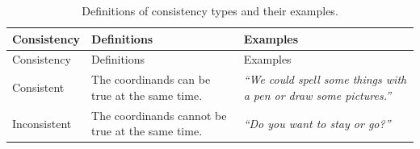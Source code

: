 \documentclass[,man,floatsintext]{apa6}
\begin{document}
\begin{longtable}[]{@{}lll@{}}
\caption{\label{tab:consistencyType} Definitions of consistency types and their examples.}\tabularnewline
\toprule
\begin{minipage}[b]{0.15\columnwidth}\raggedright
Consistency\strut
\end{minipage} & \begin{minipage}[b]{0.28\columnwidth}\raggedright
Definitions\strut
\end{minipage} & \begin{minipage}[b]{0.48\columnwidth}\raggedright
Examples\strut
\end{minipage}\tabularnewline
\midrule
\endfirsthead
\toprule
\begin{minipage}[b]{0.15\columnwidth}\raggedright
Consistency\strut
\end{minipage} & \begin{minipage}[b]{0.28\columnwidth}\raggedright
Definitions\strut
\end{minipage} & \begin{minipage}[b]{0.48\columnwidth}\raggedright
Examples\strut
\end{minipage}\tabularnewline
\midrule
\endhead
\begin{minipage}[t]{0.15\columnwidth}\raggedright
Consistent\strut
\end{minipage} & \begin{minipage}[t]{0.28\columnwidth}\raggedright
The coordinands can be true at the same time.\strut
\end{minipage} & \begin{minipage}[t]{0.48\columnwidth}\raggedright
\emph{\enquote{We could spell some things with a pen or draw some pictures.}}\strut
\end{minipage}\tabularnewline
\begin{minipage}[t]{0.15\columnwidth}\raggedright
Inconsistent\strut
\end{minipage} & \begin{minipage}[t]{0.28\columnwidth}\raggedright
The coordinands cannot be true at the same time.\strut
\end{minipage} & \begin{minipage}[t]{0.48\columnwidth}\raggedright
\emph{\enquote{Do you want to stay or go?}}\strut
\end{minipage}\tabularnewline
\bottomrule
\end{longtable}
\end{document}
